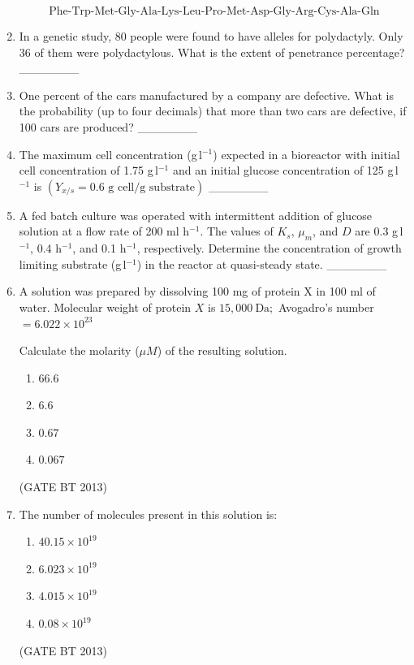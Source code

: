 \documentclass[journal,12pt,onecolumn]{IEEEtran}
\theoremstyle{remark}
\begin{document}
\begin{enumerate}
\[
\text{Phe-Trp-Met-Gly-Ala-Lys-Leu-Pro-Met-Asp-Gly-Arg-Cys-Ala-Gln}
\]
\item 

In a genetic study, 80 people were found to have alleles for polydactyly. Only 36 of them were polydactylous. What is the extent of penetrance percentage? \_\_\_\_\_\_\_

\item 

One percent of the cars manufactured by a company are defective. What is the probability (up to four decimals) that more than two cars are defective, if 100 cars are produced? \_\_\_\_\_\_\_

\item 

The maximum cell concentration (g\,l\(^{-1}\)) expected in a bioreactor with initial cell concentration of 1.75 g\,l\(^{-1}\) and an initial glucose concentration of 125 g\,l\(^{-1}\) is \(\left(Y_{x/s} = 0.6 \text{ g cell/g substrate}\right)\) \_\_\_\_\_\_\_

\item 

A fed batch culture was operated with intermittent addition of glucose solution at a flow rate of 200 ml h\(^{-1}\). The values of \(K_s\), \(\mu_m\), and \(D\) are 0.3 g\,l\(^{-1}\), 0.4 h\(^{-1}\), and 0.1 h\(^{-1}\), respectively. Determine the concentration of growth limiting substrate (g\,l\(^{-1}\)) in the reactor at quasi-steady state. \_\_\_\_\_\_\_
\item 

A solution was prepared by dissolving 100 mg of protein X in 100 ml of water.  
Molecular weight of protein \(X\) is \(15{,}000\ \mathrm{Da};\) Avogadro's number \(= 6.022 \times 10^{23}\)

Calculate the molarity (\(\mu M\)) of the resulting solution.

\begin{enumerate}
    \item $66.6$
    \item $6.6$
    \item $0.67$
    \item $0.067$
\end{enumerate} \hfill(GATE BT 2013)

\item 

The number of molecules present in this solution is:

\begin{enumerate}
    \item $40.15 \times 10^{19}$
    \item $6.023 \times 10^{19}$
    \item $4.015 \times 10^{19}$
    \item $0.08 \times 10^{19}$
\end{enumerate} \hfill(GATE BT 2013)


\end{enumerate}
\end{document}
